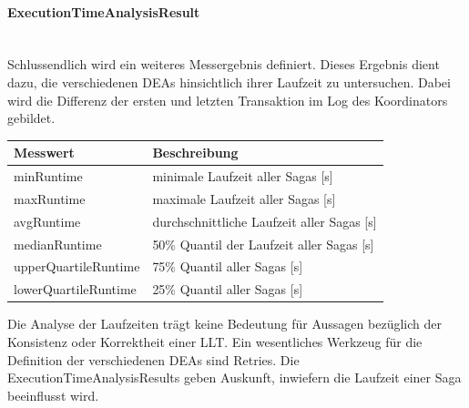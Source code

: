 \paragraph*{ExecutionTimeAnalysisResult} \mbox{}\\
Schlussendlich wird ein weiteres Messergebnis definiert. Dieses Ergebnis dient dazu, die verschiedenen DEAs hinsichtlich ihrer Laufzeit zu untersuchen. Dabei wird die Differenz der ersten und letzten Transaktion im Log des Koordinators gebildet. 

\begin{center}
	\begin{longtable}[h]{|p{5cm}|p{12cm}|}
		\hline
		Messwert & Beschreibung \\ \hline
		minRuntime & minimale Laufzeit aller Sagas [s]\\ \hline
		maxRuntime & maximale Laufzeit aller Sagas [s]\\ \hline
		avgRuntime & durchschnittliche Laufzeit aller Sagas [s]\\ \hline
		medianRuntime & 50\% Quantil der Laufzeit aller Sagas [s]\\ \hline
		upperQuartileRuntime & 75\% Quantil aller Sagas [s]\\ \hline
		lowerQuartileRuntime & 25\% Quantil aller Sagas [s]\\ \hline
\end{longtable}
\end{center}
\FloatBarrier

Die Analyse der Laufzeiten trägt keine Bedeutung für Aussagen bezüglich der Konsistenz oder Korrektheit einer LLT. Ein wesentliches Werkzeug für die Definition der verschiedenen DEAs sind Retries. Die ExecutionTimeAnalysisResults geben Auskunft, inwiefern die Laufzeit einer Saga beeinflusst wird.